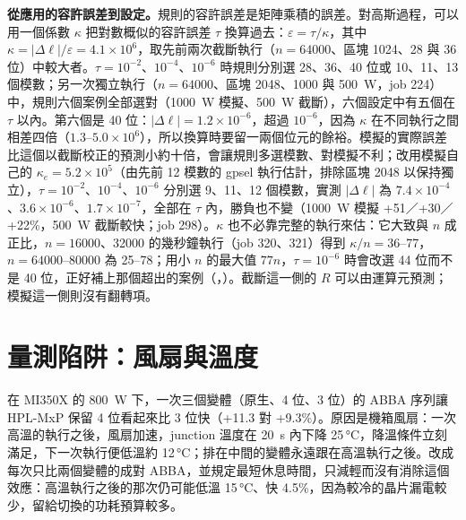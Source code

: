\textbf{從應用的容許誤差到設定。}規則的容許誤差是矩陣乘積的誤差。對高斯過程，可以用一個係數 $\kappa$ 把對數概似的容許誤差 $\tau$ 換算過去：$\varepsilon=\tau/\kappa$，其中 $\kappa=|\Delta\ell|/\varepsilon=4.1\times10^{6}$，取先前兩次截斷執行（$n=64000$、區塊 1024、28 與 36 位）中較大者。$\tau=10^{-2}$、$10^{-4}$、$10^{-6}$ 時規則分別選 28、36、40 位或 10、11、13 個模數；另一次獨立執行（$n=64000$、區塊 2048、1000 與 500~W，job 224）中，規則六個案例全部選對（1000~W 模擬、500~W 截斷），六個設定中有五個在 $\tau$ 以內。第六個是 40 位：$|\Delta\ell|=1.2\times10^{-6}$，超過 $10^{-6}$，因為 $\kappa$ 在不同執行之間相差四倍（$1.3$–$5.0\times10^{6}$），所以換算時要留一兩個位元的餘裕。模擬的實際誤差比這個以截斷校正的預測小約十倍，會讓規則多選模數、對模擬不利；改用模擬自己的 $\kappa_e=5.2\times10^{5}$（由先前 12 模數的 gpsel 執行估計，排除區塊 2048 以保持獨立），$\tau=10^{-2}$、$10^{-4}$、$10^{-6}$ 分別選 9、11、12 個模數，實測 $|\Delta\ell|$ 為 $7.4\times10^{-4}$、$3.6\times10^{-6}$、$1.7\times10^{-7}$，全部在 $\tau$ 內，勝負也不變（1000~W 模擬 +51／+30／+22\%，500~W 截斷較快；job 298）。$\kappa$ 也不必靠完整的執行來估：它大致與 $n$ 成正比，$n=16000$、32000 的幾秒鐘執行（job 320、321）得到 $\kappa/n=36$–77，$n=64000$–80000 為 25–78；用小 $n$ 的最大值 $77n$，$\tau=10^{-6}$ 時會改選 44 位而不是 40 位，正好補上那個超出的案例（，）。截斷這一側的 $R$ 可以由運算元預測；模擬這一側則沒有翻轉項。

\section{量測陷阱：風扇與溫度}\label{sec:mi-temp}

在 MI350X 的 800~W 下，一次三個變體（原生、4 位、3 位）的 ABBA 序列讓 HPL-MxP 保留 4 位看起來比 3 位快（+11.3 對 +9.3\%）。原因是機箱風扇：一次高溫的執行之後，風扇加速，junction 溫度在 20~s 內下降 25\,°C，降溫條件立刻滿足，下一次執行便低溫約 12\,°C；排在中間的變體永遠跟在高溫執行之後。改成每次只比兩個變體的成對 ABBA，並規定最短休息時間，只減輕而沒有消除這個效應：高溫執行之後的那次仍可能低溫 15\,°C、快 4.5\%，因為較冷的晶片漏電較少，留給切換的功耗預算較多。


